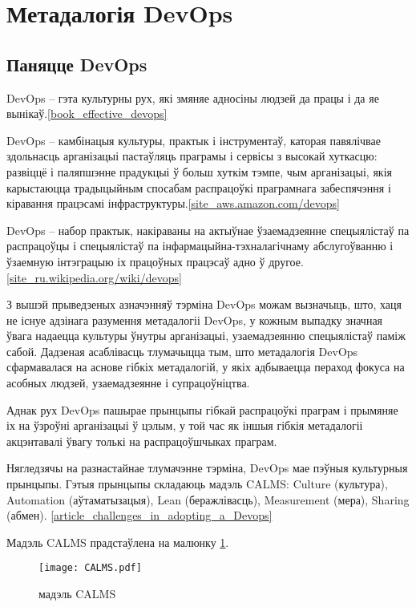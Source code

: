 \section{Метадалогія DevOps}

\subsection{Паняцце DevOps}

DevOps -- гэта культурны рух, які змяняе адносіны людзей да працы і
да яе вынікаў.\ref{book_effective_devops}

DevOps -- камбінацыя культуры, практык і інструментаў,
каторая павялічвае здольнасць арганізацыі пастаўляць праграмы і сервісы
з высокай хуткасцю: развіццё і паляпшэнне прадукцыі ў больш хуткім тэмпе,
чым арганізацыі, якія карыстаюцца традыцыйным спосабам распрацоўкі
праграмнага забеспячэння і
кіравання працэсамі інфраструктуры.\ref{site_aws.amazon.com/devops}

DevOps -- набор практык, накіраваны на актыўнае ўзаемадзеянне
спецыялістаў па распрацоўцы і спецыялістаў па інфармацыйна-тэхналагічнаму
абслугоўванню і ўзаемную інтэграцыю
іх працоўных працэсаў адно ў другое.\ref{site_ru.wikipedia.org/wiki/devops}

З вышэй прыведзеных азначэнняў тэрміна DevOps можам вызначыць,
што, хаця не існуе адзінага разумення метадалогіі DevOps,
у кожным выпадку значная ўвага надаецца культуры ўнутры арганізацыі,
узаемадзеянню спецыялістаў паміж сабой.
Дадзеная асаблівасць тлума\-чыц\-ца тым, што метадалогія DevOps сфармавалася
на аснове гібкіх метадалогій, у якіх адбываецца пераход фокуса на
асобных людзей, узаемадзеянне і супрацоўніцтва.

Аднак рух DevOps пашырае прынцыпы гібкай распрацоўкі праграм
і прымяняе іх на ўзроўні арганізацыі ў цэлым,
у той час як іншыя гібкія метадалогіі акцэнтавалі ўвагу толькі на
распрацоўшчыках праграм.

Нягледзячы на разнастайнае тлумачэнне тэрміна, DevOps мае пэўныя
культурныя прын\-цы\-пы. Гэтыя прынцыпы складаюць мадэль CALMS:
Culture (культура), Automation (аўтаматызацыя),
Lean (беражлівасць), Measurement (мера), Sharing (абмен).%
\ref{article_challenges_in_adopting_a_Devops}

Мадэль CALMS прадстаўлена на малюнку \ref{fig:CALMS model}.

\begin{figure}[h!]
    \texttt{[image: CALMS.pdf]}
    \caption{мадэль CALMS}
    \label{fig:CALMS model}
\end{figure}

